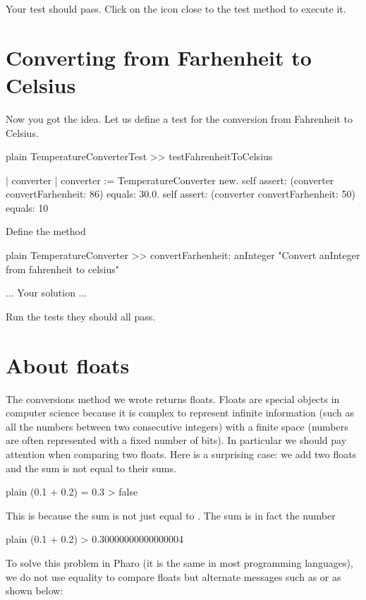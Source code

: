 \documentclass[10pt,twoside,english]{_support/latex/sbabook/sbabook}
\begin{document}
Your test should pass. Click on the icon close to the test method to execute it.
\section{Converting from Farhenheit to Celsius }
Now you got the idea. Let us define a test for the conversion from Fahrenheit to Celsius. 

\begin{displaycode}{plain}
TemperatureConverterTest >> testFahrenheitToCelsius

	| converter |
	converter := TemperatureConverter new. 
	self assert: (converter convertFarhenheit: 86) equals: 30.0.
	self assert: (converter convertFarhenheit: 50) equals: 10
\end{displaycode}

Define the method 

\begin{displaycode}{plain}
TemperatureConverter >> convertFarhenheit: anInteger 
	"Convert anInteger from fahrenheit to celsius"
	
	... Your solution ...
\end{displaycode}

Run the tests they should all pass. 
\section{About floats}
The conversions method we wrote returns floats. Floats are special objects in computer science because it is complex to represent infinite information (such as all the numbers between two consecutive integers) with a finite space (numbers are often represented with a fixed number of bits). In particular we should pay attention when comparing 
two floats. Here is a surprising case: we add two floats and the sum is not equal to their sums. 

\begin{displaycode}{plain}
(0.1 + 0.2) = 0.3
> false
\end{displaycode}

This is because the sum is not just equal to . The sum is in fact the number  

\begin{displaycode}{plain}
(0.1 + 0.2)
> 0.30000000000000004
\end{displaycode}

To solve this problem in Pharo (it is the same in most programming languages), we do not use equality to compare 
floats but alternate messages such as  or  as shown below: 
\end{document}
